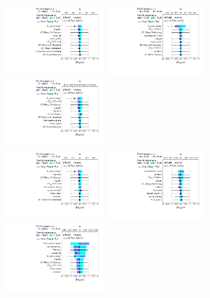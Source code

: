 \begin{figure}[ht]
  \centering
  \includegraphics[width=0.33\textwidth]{figures/diff_xsec/dilep_tty_prod_mu_blinded/Ranking/tty2l_pt_all_syst/Ranking_tty_pt_Bin_001_mu.pdf}%
  \includegraphics[width=0.33\textwidth]{figures/diff_xsec/dilep_tty_prod_mu_blinded/Ranking/tty2l_pt_all_syst/Ranking_tty_pt_Bin_002_mu.pdf}%
  \includegraphics[width=0.33\textwidth]{figures/diff_xsec/dilep_tty_prod_mu_blinded/Ranking/tty2l_pt_all_syst/Ranking_tty_pt_Bin_003_mu.pdf}\\
  \includegraphics[width=0.33\textwidth]{figures/diff_xsec/dilep_tty_prod_mu_blinded/Ranking/tty2l_pt_all_syst/Ranking_tty_pt_Bin_004_mu.pdf}%
  \includegraphics[width=0.33\textwidth]{figures/diff_xsec/dilep_tty_prod_mu_blinded/Ranking/tty2l_pt_all_syst/Ranking_tty_pt_Bin_005_mu.pdf}%
  \includegraphics[width=0.33\textwidth]{figures/diff_xsec/dilep_tty_prod_mu_blinded/Ranking/tty2l_pt_all_syst/Ranking_tty_pt_Bin_006_mu.pdf}%

\end{figure}
